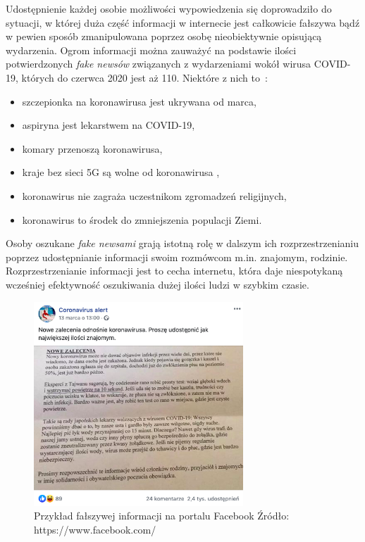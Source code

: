 Udostępnienie każdej osobie możliwości wypowiedzenia się doprowadziło do sytuacji, w której duża część informacji w internecie
jest całkowicie fałszywa bądź w pewien sposób zmanipulowana poprzez osobę nieobiektywnie opisującą wydarzenia. Ogrom informacji
można zauważyć na podstawie ilości potwierdzonych \textit{fake newsów} związanych z wydarzeniami wokół wirusa COVID-19, których do 
czerwca 2020 jest aż 110. Niektóre z nich to~\cite{Korona}:
\begin{itemize}
    \item szczepionka na koronawirusa jest ukrywana od marca,
    \item aspiryna jest lekarstwem na COVID-19,
    \item komary przenoszą koronawirusa,
    \item kraje bez sieci 5G są wolne od koronawirusa ,
    \item koronawirus nie zagraża uczestnikom zgromadzeń religijnych,
    \item koronawirus to środek do zmniejszenia populacji Ziemi.
\end{itemize}
Osoby oszukane \textit{fake newsami} grają istotną rolę w dalszym ich rozprzestrzenianiu poprzez udostępnianie informacji swoim rozmówcom
m.in. znajomym, rodzinie. Rozprzestrzenianie informacji jest to cecha internetu, która daje niespotykaną wcześniej efektywność oszukiwania dużej ilości ludzi w szybkim
czasie. 
\begin{figure}[h!]
    \centering
    \includegraphics[width=0.7\textwidth]{./Img/cvfakenews.png}
    \caption{Przykład fałszywej informacji na portalu Facebook Źródło: https://www.facebook.com/}
\end{figure}

